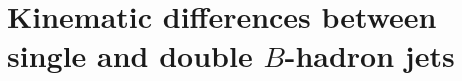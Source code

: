 




\section{Kinematic differences between single and double $B$-hadron jets}\label{sec:gbbKine} %



